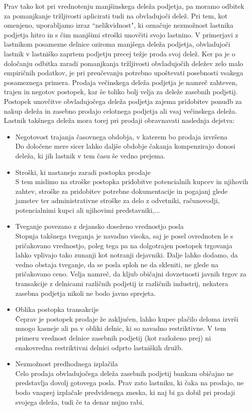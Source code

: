 \documentclass[12pt,a4paper]{amsart}
\theoremstyle{definition} %
\theoremstyle{plain} %
\begin{document}
Prav tako kot pri vrednotenju manjšinskega deleža podjetja, pa moramo odbitek za pomanjkanje tržljivosti aplicirati tudi na obvladujoči delež. Pri tem, kot omenjeno, uporabljamo izraz ``nelikvidnost", ki označuje nezmožnost lastnika podjetja hitro in s čim manjšimi stroški unovčiti svojo lastnino. V primerjavi z lastnikom posamezne delnice oziroma manjšega deleža podjetja, obvladujoči lastnik v lastniško zaprtem podjetju precej težje proda svoj delež. Ker pa je o določanju odbitka zaradi pomanjkanja tržljivosti obvladujočih deležev zelo malo empiričnih podatkov, je pri preučevanju potrebno upoštevati posebnosti vsakega posameznega primera.%
Prodaja večinskega deleža podjetja je namreč zahteven, trajen in negotov postopek, kar še toliko bolj velja za deleže zasebnih podjetij. Postopek unovčitve obvladujočega deleža podjetja zajema pridobitev ponudb za nakup deleža in zasebno prodajo celotnega podjetja ali vsaj večinskega deleža. Lastnik takšnega deleža mora torej pri prodaji obravnavati naslednja dejstva:
\begin{itemize}
\item Negotovost trajanja časovnega obdobja, v katerem bo prodaja izvršena\\
Do določene mere sicer lahko daljše obdobje čakanja kompenzirajo donosi deleža, ki jih lastnik v tem času še vedno prejema.
\item Stroški, ki nastanejo zaradi postopka prodaje\\
S tem mislimo na stroške postopka pridobitve potencialnih kupcev in njihovih zahtev, stroške za pridobitev potrebne dokumentacije in pogajanj glede jamstev ter administrativne stroške za delo z odvetniki, računovodji, potencialnimi kupci ali njihovimi predstavniki,...
\item Tveganje povezano z dejansko doseženo vrednostjo posla\\
Stopnja takšnega tveganja je navadno visoka, saj je posel ovrednoten le s pričakovano vrednostjo, poleg tega pa na dolgotrajen postopek trgovanja lahko vplivajo tako zunanji kot notranji dejavniki. Dalje lahko dodamo, da vedno obstaja tveganje, da se posla sploh ne da skleniti, ne glede na pričakovano ceno. Velja namreč, da kljub običajni dovzetnosti javnih trgov za transakcije z delnicami različnih podjetij iz različnih industrij, nekatera zasebna podjetja nikoli ne bodo javno sprejeta.
\item Oblika postopka transakcije\\
Čeprav je postopek prodaje že zaključen, lahko kupec plačilo deloma izvrši mnogo kasneje ali pa v obliki delnic, ki so navadno restriktivne. V tem primeru vrednost delnice zasebnih podjetij (kot razloženo prej) ni enakovredna restriktivni delnici odprto lastniških družb.
\item Nezmožnost predhodnega izplačila\\
Celo prodaja obvladujočega deleža zasebnih podjetij bankam običajno ne predstavlja dovolj gotovega posla. Prav zato lastniku, ki čaka na prodajo, ne bodo vnaprej izplačale predvidenega zneska, ki naj bi ga dobil pri prodaji svojega deleža, tudi če ta denar nujno rabi.
\end{itemize}
\end{document}
